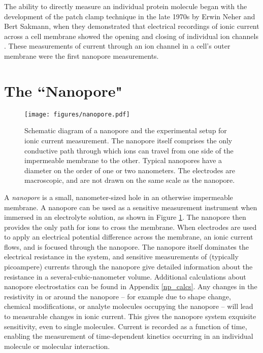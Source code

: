 The ability to directly measure an individual protein molecule began with the development of the patch clamp technique in the late 1970s by Erwin Neher and Bert Sakmann, when they demonstrated that electrical recordings of ionic current across a cell membrane showed the opening and closing of individual ion channels \citep{Neher1976}.  These measurements of current through an ion channel in a cell's outer membrane were the first nanopore measurements.

\section{The ``Nanopore"}

\begin{figure}[h]
\begin{centering}
\texttt{[image: figures/nanopore.pdf]}
\caption[The nanopore setup]{Schematic diagram of a nanopore and the experimental setup for ionic current measurement.  The nanopore itself comprises the only conductive path through which ions can travel from one side of the impermeable membrane to the other.  Typical nanopores have a diameter on the order of one or two nanometers.  The electrodes are macroscopic, and are not drawn on the same scale as the nanopore.}
\label{fig:nanopore}
\end{centering}
\end{figure}

A \textit{nanopore} is a small, nanometer-sized hole in an otherwise impermeable membrane.  A nanopore can be used as a sensitive measurement instrument when immersed in an electrolyte solution, as shown in Figure \ref{fig:nanopore}.  The nanopore then provides the only path for ions to cross the membrane.  When electrodes are used to apply an electrical potential difference across the membrane, an ionic current flows, and is focused through the nanopore.  The nanopore itself dominates the electrical resistance in the system, and sensitive measurements of (typically picoampere) currents through the nanopore give detailed information about the resistance in a several-cubic-nanometer volume.  Additional calculations about nanopore electrostatics can be found in Appendix \ref{np_calcs}.  Any changes in the resistivity in or around the nanopore -- for example due to shape change, chemical modifications, or analyte molecules occupying the nanopore -- will lead to measurable changes in ionic current.  This gives the nanopore system exquisite sensitivity, even to single molecules.  Current is recorded as a function of time, enabling the measurement of time-dependent kinetics occurring in an individual molecule or molecular interaction.

